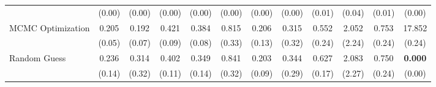 \begin{table}[ht]
{\begin{tabular}{l cccc cccc cc c}
             & (0.00) & (0.00) & (0.00) & (0.00) & (0.00) & (0.00) & (0.00) & (0.01) & (0.04) & (0.01) & (0.00) \\
            \addlinespace[0.2em]
            MCMC Optimization & 0.205 & 0.192 & 0.421 & 0.384 & 0.815 & 0.206 & 0.315 & 0.552 & 2.052 & 0.753 & 17.852 \\
             & (0.05) & (0.07) & (0.09) & (0.08) & (0.33) & (0.13) & (0.32) & (0.24) & (2.24) & (0.24) & (0.24) \\
            \addlinespace[0.2em]
            Random Guess & 0.236 & 0.314 & 0.402 & 0.349 & 0.841 & 0.203 & 0.344 & 0.627 & 2.083 & 0.750 & \textbf{0.000} \\
             & (0.14) & (0.32) & (0.11) & (0.14) & (0.32) & (0.09) & (0.29) & (0.17) & (2.27) & (0.24) & (0.00) \\
            \bottomrule
        \end{tabular}%
    }
\end{table}